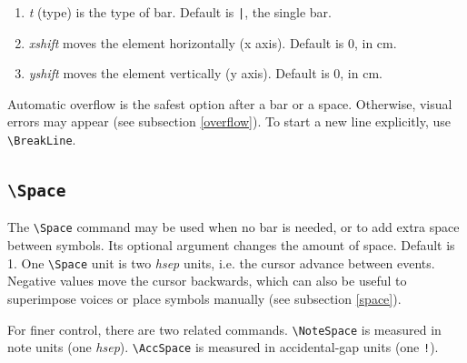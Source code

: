 \documentclass[final]{article}
\newcommand{\TTT}[2][0]{\Text[yshift=#1]{\texttt{\textbackslash #2}}}
\begin{document}
	\begin{enumerate}[-]
		\item \textsl{t} (type) is the type of bar. Default is \texttt{|}, the single bar.
		\item \textsl{xshift} moves the element horizontally (x axis). Default is 0, in cm.
		\item \textsl{yshift} moves the element vertically (y axis). Default is 0, in cm.
	\end{enumerate}
	
	\begin{center}
		\begin{mousik}
			\TTT{Barline}
			\Barline
			\Space[0.5]
			\Barline[t= ||]
			\Space[0.5]
			\Barline[t= |.]
			\Space[0.5]
			\Barline[t= |:]
			\Space[0.5]
			\Barline[t= :|:]
			\Space[0.5]
			\Barline[t= :|]
			\Space[0.5]
			\Barline[t= :]
		\end{mousik}
	\end{center}
	
	Automatic overflow is the safest option after a bar or a space. Otherwise, visual errors may appear (see subsection \ref{overflow}). To start a new line explicitly, use \verb|\BreakLine|.
	
	\subsection{\texttt{\textbackslash Space}}
	The \verb|\Space| command may be used when no bar is needed, or to add extra space between symbols. Its optional argument changes the amount of space. Default is 1. One \verb|\Space| unit is two \textsl{hsep} units, i.e. the cursor advance between events. Negative values move the cursor backwards, which can also be useful to superimpose voices or place symbols manually (see subsection \ref{space}).

For finer control, there are two related commands. \verb|\NoteSpace| is measured in note units (one \textsl{hsep}). \verb|\AccSpace| is measured in accidental-gap units (one \texttt{!}).
	
	\begin{center}
		\begin{mousik}
			\Barline
			\Text{\hspace*{-55pt}\ttfamily[-0.5]}
			\Space[-0.5]
			\Barline
			\Text{\hspace*{-25pt}\ttfamily[0]}
			\Space[0]
			\Barline
			\Text{\hspace*{-14pt}\ttfamily[0.5]}
			\Space[0.5]
			\Barline
			\Text{\hspace*{-0.5pt}\ttfamily[1]}
			\Space[1]
			\Barline
			\Text{\hspace*{13pt}\ttfamily[1.5]}
			\Space[1.5]
			\Barline[t=|.]
		\end{mousik}
	\end{center}
	
\end{document}
